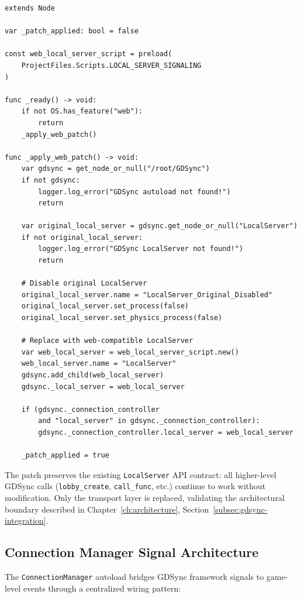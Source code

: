 \begin{lstlisting}[caption={GDSync web patch (gdsync\_web\_patch.gd)}]
extends Node

var _patch_applied: bool = false

const web_local_server_script = preload(
    ProjectFiles.Scripts.LOCAL_SERVER_SIGNALING
)

func _ready() -> void:
    if not OS.has_feature("web"):
        return
    _apply_web_patch()

func _apply_web_patch() -> void:
    var gdsync = get_node_or_null("/root/GDSync")
    if not gdsync:
        logger.log_error("GDSync autoload not found!")
        return

    var original_local_server = gdsync.get_node_or_null("LocalServer")
    if not original_local_server:
        logger.log_error("GDSync LocalServer not found!")
        return

    # Disable original LocalServer
    original_local_server.name = "LocalServer_Original_Disabled"
    original_local_server.set_process(false)
    original_local_server.set_physics_process(false)

    # Replace with web-compatible LocalServer
    var web_local_server = web_local_server_script.new()
    web_local_server.name = "LocalServer"
    gdsync.add_child(web_local_server)
    gdsync._local_server = web_local_server

    if (gdsync._connection_controller
        and "local_server" in gdsync._connection_controller):
        gdsync._connection_controller.local_server = web_local_server

    _patch_applied = true
\end{lstlisting}

The patch preserves the existing \texttt{LocalServer} API contract: all higher-level GDSync calls (\texttt{lobby\_create}, \texttt{call\_func}, etc.) continue to work without modification. Only the transport layer is replaced, validating the architectural boundary described in Chapter~\ref{ch:architecture}, Section~\ref{subsec:gdsync-integration}.

\subsection{Connection Manager Signal Architecture}
\label{subsec:connection-manager-signals}

The \texttt{ConnectionManager} autoload bridges GDSync framework signals to game-level events through a centralized wiring pattern:

